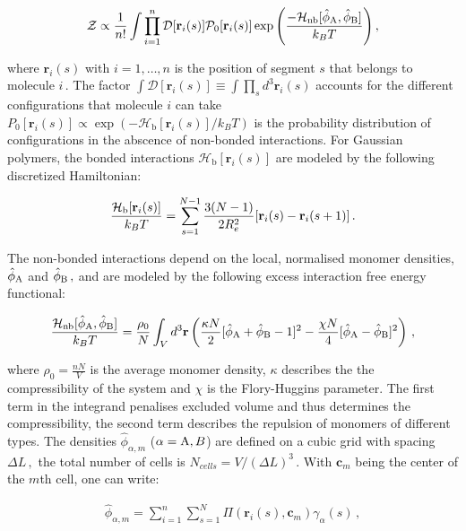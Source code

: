\documentclass[bachelor,       %
               twoside,        %
               BCOR10mm,       %
               ngerman, english %
               ]{GAUBM}
\begin{document}
\begin{align}
    \mathcal{Z}\propto\frac{1}{n!}\int{\prod_{i=1}^n\mathcal{D}[\mathbf r_i(s)]\mathcal P_0[\mathbf r_i(s)]\exp\left(\frac{-\mathcal H_{\text{nb}}[\hat\phi_\text A,\hat\phi_\text B]}{k_BT}\right)}\,,
\end{align}

where $\mathbf r_i(s)$ with $i=1,\dots,n$ is the position of segment $s$ that belongs to molecule $i\,.$ The factor $\int\mathcal{D}[\mathbf r_i(s)]\equiv \int\prod_sd^3\mathbf r_i(s)$ accounts for the different configurations that molecule $i$ can take $P_0[\mathbf r_i(s)]\propto\exp\left(-\mathcal H_{\text{b}}[\mathbf r_i(s)]/k_BT\right)$ is the probability distribution of configurations in the abscence of non-bonded interactions. For Gaussian polymers, the bonded interactions $\mathcal H_{\text{b}}[\mathbf r_i(s)]$ are modeled by the following discretized Hamiltonian:

\begin{align}
    \frac{\mathcal H_\text b[\mathbf r_i(s)]}{k_BT}=\sum_{s=1}^{N-1}\frac{3(N-1)}{2R_e^2}[\mathbf r_i(s)-\mathbf r_i(s+1)]\,.
\end{align}

The non-bonded interactions depend on the local, normalised monomer densities, $\hat\phi_\text A$ and $\hat\phi_\text B\,,$ and are modeled by the following excess interaction free energy functional:

\begin{align}
    \frac{\mathcal H_\text{nb}[\hat\phi_\text A,\hat\phi_\text B]}{k_BT}=\frac{\rho_0}{N}\int_Vd^3\mathbf r\left(\frac{\kappa N}{2}[\hat\phi_\text A+\hat\phi_\text B-1]^2-\frac{\chi N}{4}[\hat\phi_\text A-\hat\phi_\text B]^2\right)\,,
    \label{eq:nonbonded}
\end{align}

where $\rho_0=\frac{nN}{V}$ is the average monomer density, $\kappa$ describes the the compressibility of the system and $\chi$ is the Flory-Huggins parameter. The first term in the integrand penalises excluded volume and thus determines the compressibility, the second term describes the repulsion of monomers of different types. The densities $\hat\phi_{\alpha,m}$ ($\alpha=\text A,B$) are defined on a cubic grid with spacing $\Delta L\,,$ the total number of cells is $N_{cells}=V/(\Delta L)^3\,.$ With $\mathbf c_m$ being the center of the $m$th cell, one can write:

\begin{align}
    \hat\phi_{\alpha,m}=\sum_{i=1}^n\sum_{s=1}^N\Pi(\mathbf r_i(s),\mathbf c_m)\gamma_\alpha(s)\,,
\end{align}
\end{document}
